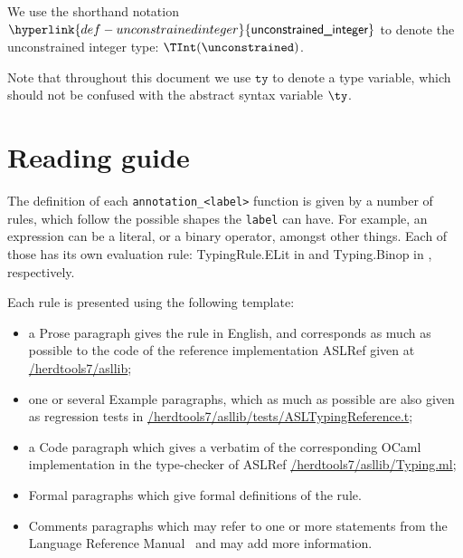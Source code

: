 \documentclass{book}
\newcommand\unconstrainedinteger[0]{\hyperlink{def-unconstrainedinteger}{\textsf{unconstrained\_integer}}}
\newcommand\tty[0]{\texttt{ty}}
\begin{document}
\hypertarget{def-unconstrainedinteger}{}
We use the shorthand notation $\unconstrainedinteger$ to denote the unconstrained integer type: $\TInt(\unconstrained)$.

Note that throughout this document we use $\tty$ to denote a type variable, which should not be confused with the abstract syntax variable $\ty$.

\chapter{Reading guide}

The definition of each \texttt{annotation\_<label>} function is given by a number of
rules, which follow the possible shapes the \texttt{label} can have. For
example, an expression can be a literal, or a binary operator, amongst other
things. Each of those has its own evaluation rule: TypingRule.ELit in
 and
Typing.Binop in , respectively.

Each rule is presented using the following template:
\begin{itemize}
\item a Prose paragraph gives the rule in English, and corresponds as much as possible to the code of the reference implementation ASLRef given at
\href{https://github.com/herd/herdtools7//tree/master/asllib}{/herdtools7/asllib};
\item one or several Example paragraphs, which as much as possible are also given as regression tests in
\href{https://github.com/herd/herdtools7//tree/master/asllib/tests/ASLTypingReference.t}{/herdtools7/asllib/tests/ASLTypingReference.t};
\ifcode
\item a Code paragraph which gives a verbatim of the corresponding OCaml implementation in the type-checker of ASLRef
\href{https://github.com/herd/herdtools7//tree/master/asllib/Typing.ml}{/herdtools7/asllib/Typing.ml};
\fi
\item Formal paragraphs which give formal definitions of the rule.
\item Comments paragraphs which may refer to one or more statements from the Language Reference Manual~\cite{LRM}
      and may add more information.
\end{itemize}

\end{document}
